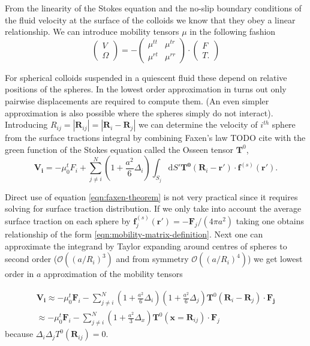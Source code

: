 \documentclass{doctoral}
\newcommand{\dd}{\mathrm{d}}
\begin{document}
From the linearity of the Stokes equation and the no-slip boundary conditions of the fluid velocity at the surface of the colloids we know that they obey a linear relationship.
We can introduce mobility tensors $\mu$ in the following fashion
\begin{equation}
    \begin{pmatrix}
        V \\
        \Omega
    \end{pmatrix}
    = -
    \begin{pmatrix}
        \mu^{tt} & \mu^{tr} \\
        \mu^{rt} & \mu^{rr}
    \end{pmatrix}
    \cdot
    \begin{pmatrix}
        F \\
        T.
    \end{pmatrix}
    \label{eqn:mobility-matrix-definition}
\end{equation}

For spherical colloids suspended in a quiescent fluid these depend on relative positions of the spheres.
In the lowest order approximation in turns out only pairwise displacements are required to compute them.
(An even simpler approximation is also possible where the spheres simply do not interact).
Introducing $R_{ij} = |\bm{R}_{ij}| = |\bm{R}_i - \bm{R}_j|$ we can determine the velocity of $i^{th}$ sphere from the surface tractions integral by combining Faxen's law TODO cite with the green function of the Stokes equation called the Osseen tensor $\bm{T}^0$,
\begin{equation}
    \bm{V_i} = -\mu_0^t F_i + \sum_{j\neq i}^N (1 + \frac{a^2}{6} \Delta_i) \int_{S_j} \dd S' \bm{T^0}(\bm{R}_i-\bm{r'})\cdot \bm{f}^{(s)}(\bm{r'}).
    \label{eqn:faxen-theorem}
\end{equation}

Direct use of equation \eqref{eqn:faxen-theorem} is not very practical since it requires solving for surface traction distribution.
If we only take into account the average surface traction on each sphere  by $\bm{f}_j^{(s)}(\bm{r'}) = -\bm{F}_j / (4\pi a^2)$ taking one obtains relationship of the form \eqref{eqn:mobility-matrix-definition}.
Next one can approximate the integrand by Taylor expanding around centres of spheres to second order ($\mathcal{O}((a/R_i)^3)$ and from symmetry $\mathcal{O}((a/R_i)^4)$) we get lowest order in $a$ approximation of the mobility tensors 

\begin{eqnarray}
    \bm{V_i} \approx -\mu_0^t \bm{F}_i  - \sum_{j\neq i}^N (1 + \frac{a^2}{6} \Delta_i) (1 + \frac{a^2}{6} \Delta_j) \bm{T}^{0} (\bm{R}_i - \bm{R}_j) \cdot \bm{F_j} \\
    \approx -\mu_0^t \bm{F}_i  - \sum_{j\neq i}^N (1 + \frac{a^2}{3} \Delta_x) \bm{T}^{0} (\bm{x} = \bm{R}_{ij}) \cdot \bm{F}_j \label{eqn:rotne-prager-derivation}
\end{eqnarray}
because $\Delta_i \Delta_j T^0(\bm{R}_{ij}) = 0$.
\end{document}
